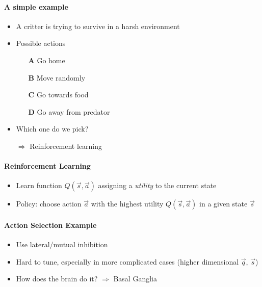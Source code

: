 \documentclass[10pt,letterpaper,oneside]{article}
\begin{document}
\paragraph{A simple example}
\begin{itemize}
	\item A critter is trying to survive in a harsh environment
	\item Possible actions
	\begin{itemize}
		\item[\textbf{A}] Go home
		\item[\textbf{B}] Move randomly
		\item[\textbf{C}] Go towards food
		\item[\textbf{D}] Go away from predator
	\end{itemize}
	\item Which one do we pick?
	\item[$\Rightarrow$] Reinforcement learning
\end{itemize}

\paragraph{Reinforcement Learning}
\begin{itemize}
	\item Learn function $Q(\vec s, \vec a)$ assigning a \emph{utility} to the current state
	\item Policy: choose action $\vec a$ with the highest utility $Q(\vec s, \vec a)$ in a given state $\vec s$
\end{itemize}

\paragraph{Action Selection Example}
\begin{itemize}
	\item Use lateral/mutual inhibition
	\item Hard to tune, especially in more complicated cases (higher dimensional $\vec q$, $\vec s$)
	\item How does the brain do it? $\Rightarrow$ Basal Ganglia
\end{itemize}
\end{document}
